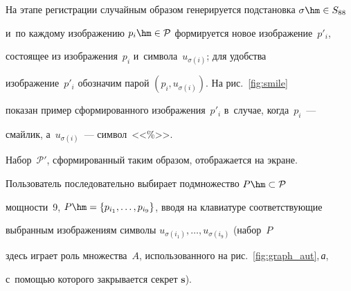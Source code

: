 \setcounter{figure}{1}







На этапе регистрации случайным образом генерируется подстановка $\sigma\hm\in {S}_{88}$ 


и~по каждому изображению $p_i\hm\in \mathcal{P}$ формируется новое изображение~$p'_i$, 


состоящее из изображения~$p_i$ и~символа~$u_{\sigma(i)}$; для удобства 


изображение~$p'_i$ обозначим парой $(p_i,u_{\sigma(i)})$. На рис.~\ref{fig:smile} 


показан пример сформированного изображения~$p'_i$ в~случае, когда~$p_i$~--- 


смайлик, а~$u_{\sigma(i)}$~--- символ~<<\%>>.


\setcounter{figure}{1}


Набор~$\mathcal{P}'$, сформированный таким образом, отображается на экране. 


Пользователь последовательно выбирает подмножество $P\hm\subset \mathcal{P}$ 


мощности~9, $P\hm=\{p_{i_1},\ldots,p_{i_9}\}$, вводя на клавиатуре соответствующие 


выбранным изображениям символы $u_{\sigma(i_1)},\ldots,u_{\sigma(i_9)}$ (набор~$P$ 


здесь играет роль множества~$A$, использованного на рис.~\ref{fig:graph_aut},\,\textit{а}, 


с~помощью которого закрывается секрет $\mathbf{s}$). 


